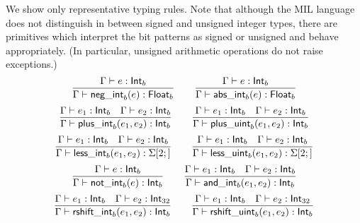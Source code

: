 \documentclass[12pt,twoside,fleqn]{article}
\begin{document}
   { }
   {We show only representative typing rules.  Note that although the
    MIL language does not distinguish in between signed and unsigned
    integer types, there are primitives which interpret the bit
    patterns as signed or unsigned and behave appropriately.  (In 
    particular, unsigned arithmetic operations do not raise exceptions.)}
  {\[
   \frac{\Gamma\vdash e : \mathsf{Int}_{b}}
        {\Gamma\vdash \mathsf{neg\_int}_b(e) : \mathsf{Float}_{b}}
   \qquad
   \frac{\Gamma\vdash e : \mathsf{Int}_{b}}
        {\Gamma\vdash \mathsf{abs\_int}_b(e) : \mathsf{Float}_{b}}
   \]
   \[
   \frac{\Gamma\vdash e_1 : \mathsf{Int}_{b}
         \quad
         \Gamma\vdash e_2 : \mathsf{Int}_{b}}
        {\Gamma\vdash \mathsf{plus\_int}_b(e_1,e_2) : \mathsf{Int}_{b}}
   \qquad
   \frac{\Gamma\vdash e_1 : \mathsf{Int}_{b}
         \quad
         \Gamma\vdash e_2 : \mathsf{Int}_{b}}
        {\Gamma\vdash \mathsf{plus\_uint}_b(e_1,e_2) : \mathsf{Int}_{b}}
   \]
   \[
   \frac{\Gamma\vdash e_1 : \mathsf{Int}_{b}
         \quad
         \Gamma\vdash e_2 : \mathsf{Int}_{b}}
        {\Gamma\vdash \mathsf{less\_int}_b(e_1,e_2) : \Sigma[2;]}
   \qquad
   \frac{\Gamma\vdash e_1 : \mathsf{Int}_{b}
         \quad
         \Gamma\vdash e_2 : \mathsf{Int}_{b}}
        {\Gamma\vdash \mathsf{less\_uint}_b(e_1,e_2) : \Sigma[2;]}
   \]
   \[
   \frac{\Gamma\vdash e : \mathsf{Int}_{b}}
        {\Gamma\vdash \mathsf{not\_int}_b(e) : \mathsf{Int}_{b}}
   \qquad
   \frac{\Gamma\vdash e_1 : \mathsf{Int}_{b}
         \quad
         \Gamma\vdash e_2 : \mathsf{Int}_{b}}
        {\Gamma\vdash \mathsf{and\_int}_b(e_1,e_2) : \mathsf{Int}_{b}}
   \]
   \[
   \frac{\Gamma\vdash e_1 : \mathsf{Int}_{b}
         \quad
         \Gamma\vdash e_2 : \mathsf{Int}_{32}}
        {\Gamma\vdash \mathsf{rshift\_int}_b(e_1,e_2) : \mathsf{Int}_{b}}
   \qquad
   \frac{\Gamma\vdash e_1 : \mathsf{Int}_{b}
         \quad
         \Gamma\vdash e_2 : \mathsf{Int}_{32}}
        {\Gamma\vdash \mathsf{rshift\_uint}_b(e_1,e_2) : \mathsf{Int}_{b}}
   \]
   }
\end{document}
